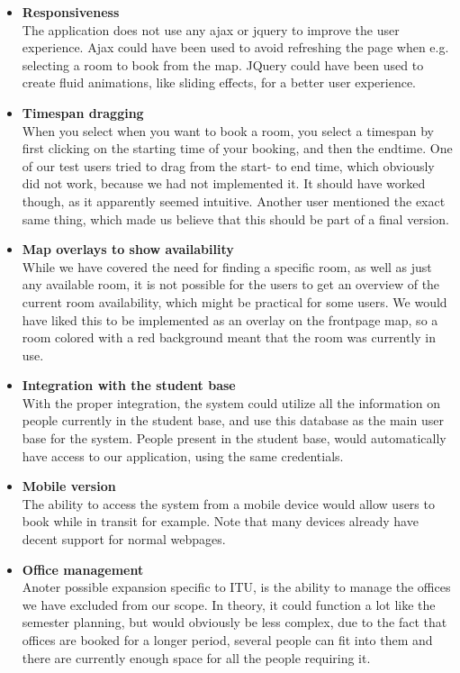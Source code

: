 \begin{itemize}
	\item \textbf{Responsiveness}\\
	The application does not use any ajax or jquery to improve the user experience. Ajax could have been used to avoid refreshing the page when e.g. selecting a room to book from the map. JQuery could have been used to create fluid animations, like sliding effects, for a better user experience. 
	
	\item \textbf{Timespan dragging}\\
	When you select when you want to book a room, you select a timespan by first clicking on the starting time of your booking, and then the endtime. One of our test users tried to drag from the start- to end time, which obviously did not work, because we had not implemented it. It should have worked though, as it apparently seemed intuitive. Another user mentioned the exact same thing, which made us believe that this should be part of a final version.
	
	\item \textbf{Map overlays to show availability}\\
	While we have covered the need for finding a specific room, as well as just any available room, it is not possible for the users to get an overview of the current room availability, which might be practical for some users. We would have liked this to be implemented as an overlay on the frontpage map, so a room colored with a red background meant that the room was currently in use.
	
	\item \textbf{Integration with the student base}\\
	With the proper integration, the system could utilize all the information on people currently in the student base, and use this database as the main user base for the system. People present in the student base, would automatically have access to our application, using the same credentials. 
	
	\item \textbf{Mobile version}\\
	The ability to access the system from a mobile device would allow users to book while in transit for example. Note that many devices already have decent support for normal webpages.
	
	\item \textbf{Office management}\\
	Anoter possible expansion specific to ITU, is the ability to manage the offices we have excluded from our scope. In theory, it could function a lot like the semester planning, but would obviously be less complex, due to the fact that offices are booked for a longer period, several people can fit into them and there are currently enough space for all the people requiring it.
\end{itemize}

